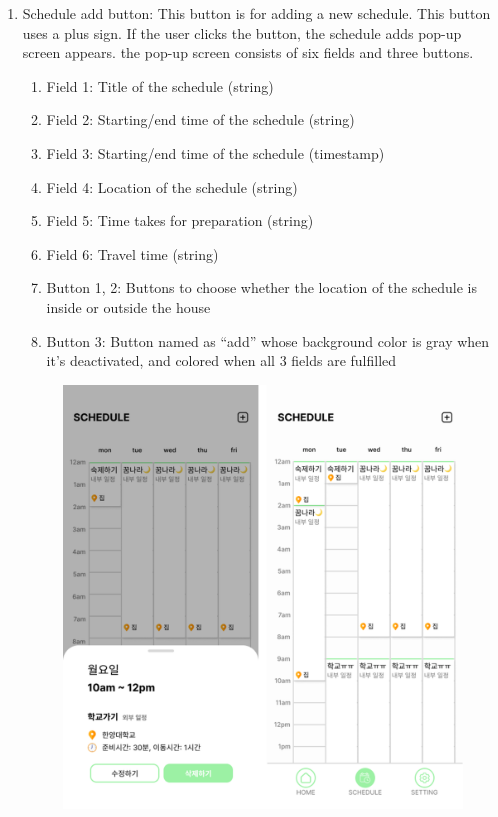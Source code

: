 \documentclass[conference]{IEEEtran}
\begin{document}
\begin{enumerate}[label=\arabic*.]
    \begin{enumerate}[label=\alph*.]
        \item {\large{Schedule add button: This button is for adding a new schedule. This button uses a plus sign. If the user clicks the button, the schedule adds pop-up screen appears. the pop-up screen consists of six fields and three buttons.}} \\
        \begin{enumerate}[label=\roman*.]
            \item {\large{Field 1: Title of the schedule (string)}} 
            \item {\large{Field 2: Starting/end time of the schedule (string)}} 
            \item {\large{Field 3: Starting/end time of the schedule (timestamp)}} 
            \item {\large{Field 4: Location of the schedule (string)}} 
            \item {\large{Field 5: Time takes for preparation (string)}} 
            \item {\large{Field 6: Travel time (string) }}   
            \item {\large{Button 1, 2: Buttons to choose whether the location of the schedule is inside or outside the house}} 
            \item {\large{Button 3: Button named as “add” whose background color is gray when it’s deactivated, and colored when all 3 fields are fulfilled}} \\            
        \end{enumerate}
        \begin{figure}[H]\centering \includegraphics[scale=0.4]{images/schedule.png}\end{figure}        

\end{enumerate}
\end{enumerate}
\end{document}
